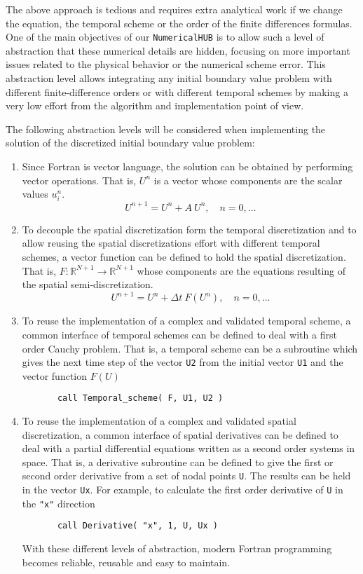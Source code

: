 \newpage 
The above approach is tedious and requires extra analytical work if we change the equation, the temporal scheme or the order of the finite differences formulas. 
One of the main objectives of our \verb|NumericalHUB| is to allow such a level of abstraction that these numerical details are hidden, focusing on more important issues related to the physical behavior or the numerical scheme error. 
This abstraction level allows integrating any initial boundary value problem with different finite-difference orders or with different temporal schemes by making a very low effort from the algorithm and implementation point of view.  


The following abstraction levels will be considered when implementing the solution of the discretized initial boundary value problem:
\begin{enumerate}
\item Since  Fortran is vector language, the solution can be obtained by performing vector operations. That is,  $ U^n $ is a vector whose components are the scalar values $ u^n_i$. 
$$ 
    U^{n+1} =  U^{n} + A \ U^n, \quad n=0, \ldots 
$$

\item To decouple the spatial discretization form the temporal discretization and to allow reusing the spatial discretizations effort with different temporal schemes, a vector function can be defined to hold the spatial discretization. That is, 
$ F : \mathbb{R}^{N+1}\rightarrow \mathbb{R}^{N+1} $ whose components are the equations resulting of the spatial semi-discretization.
$$ 
    U^{n+1} =  U^n + \Delta t \ F(U^n), \quad n=0, \ldots 
$$
 
\item To reuse the implementation of a complex and validated temporal scheme, a common interface of temporal schemes can be defined to deal with a first order Cauchy problem. That is, a temporal scheme can be a subroutine which gives the next time step of the vector  \verb|U2| 
from the initial vector \verb|U1| and the vector function $ F(U)$
\begin{verbatim}
       call Temporal_scheme( F, U1, U2 ) 
\end{verbatim}

\item To reuse the implementation of a complex and validated spatial discretization, a common interface of spatial derivatives can be defined to deal with a partial differential equations written as a second order systems in space.  That is, a derivative subroutine can be defined to give the first or second order derivative from a set of nodal points  \verb|U|.  The results can be held  in the vector \verb|Ux|. 
For example, to calculate the first order derivative of \verb|U| in the \verb|"x"| direction
\begin{verbatim}
       call Derivative( "x", 1, U, Ux ) 
\end{verbatim}
With these different levels of abstraction, modern Fortran programming becomes reliable, reusable and easy to maintain.    

  
\end{enumerate}


